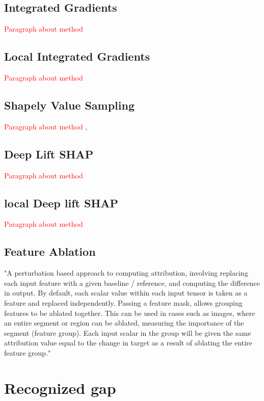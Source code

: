 \documentclass[12pt]{report}
\begin{document}
\subsection{Integrated Gradients}

		\textcolor{red}{Paragraph about method} \cite{DBLP:journals/corr/SundararajanTY17}

\subsection{Local Integrated Gradients}
		\textcolor{red}{Paragraph about method} \cite{https://doi.org/10.48550/arxiv.1711.06104}

\subsection{Shapely Value Sampling}
		\textcolor{red}{Paragraph about method} \cite{CASTRO20091726}, \cite{trumbelj2010AnEE}

\subsection{Deep Lift SHAP}
		\textcolor{red}{Paragraph about method} \cite{DBLP:journals/corr/LundbergL17}


\subsection{local Deep lift SHAP}

		\textcolor{red}{Paragraph about method} \cite{https://doi.org/10.48550/arxiv.1711.06104}

\subsection{Feature Ablation}
"A perturbation based approach to computing attribution, involving replacing each input feature with a given baseline / reference, and computing the difference in output. By default, each scalar value within each input tensor is taken as a feature and replaced independently. Passing a feature mask, allows grouping features to be ablated together. This can be used in cases such as images, where an entire segment or region can be ablated, measuring the importance of the segment (feature group). Each input scalar in the group will be given the same attribution value equal to the change in target as a result of ablating the entire feature group."

\newpage
\section{Recognized gap}
\end{document}
